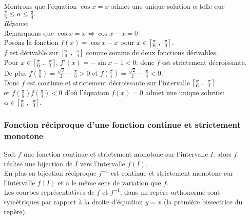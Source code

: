 \begin{example}
\begin{example}
Montrons  que l'équation $ \cos x= x $ admet une unique solution $ \alpha$ telle que \\   $ \frac{\pi}{6} \leq \alpha \leq\frac{\pi}{4}.$ \\
\emph{Réponse}\\
Remarquons que  $ \cos x= x  \Leftrightarrow \cos x- x=0$\\
Posons la fonction $ f(x)= \cos x- x$ pour $ x\in \left[\frac{\pi}{6}\;,\; \frac{\pi}{4}\right] $.\\
$ f $ est dérivable sur $\left[\frac{\pi}{6}\;,\; \frac{\pi}{4}\right] $ comme somme de deux fonctions dérivables. \\
Pour $ x\in \left[\frac{\pi}{6}\;,\; \frac{\pi}{4}\right] $, $ f'(x)=-\sin x-1< 0 $; donc $ f $ est strictement décroissante.\\
De plus $ f(\frac{\pi}{6})=\frac{\sqrt{3}}{2} -\frac{\pi}{6 }> 0$  et $ f(\frac{\pi}{4})=\frac{\sqrt{2}}{2} -\frac{\pi}{4 }< 0$.\\
 Donc $ f $ est continue et strictement décroissante sur  l'intervalle $ \left[\frac{\pi}{6 }\;,\; \frac{\pi}{4}\right] $ \\et $ f(\frac{\pi}{6})f(\frac{\pi}{4}) < 0 $ 
d'où l'équation $ f(x)=0 $ admet une  unique  solution $ \alpha \in \left[\frac{\pi}{6}\;,\; \frac{\pi}{4}\right] $.


\end{example}

\subsubsection*{Fonction réciproque d'une fonction continue et strictement monotone} 

\begin{theorem}
Soit $ f $ une fonction continue et strictement monotone  sur  l'intervalle $I$; alors $ f $ réalise une bijection de $ I $ vers l'intervalle $ f(I)$.\\
En plus sa bijection réciproque $ f^{-1} $ est continue et strictement monotone  sur  l'intervalle $f(I)$ et a le même sens de variation que $ f. $\\
Les courbes représentatives de $f $  et $f^{-1} $, dans un repère orthonormé sont symétriques par rapport  à la droite d'équation $ y=x $ (la première  bissectrice  du repère).
\end{theorem}

\end{example}
